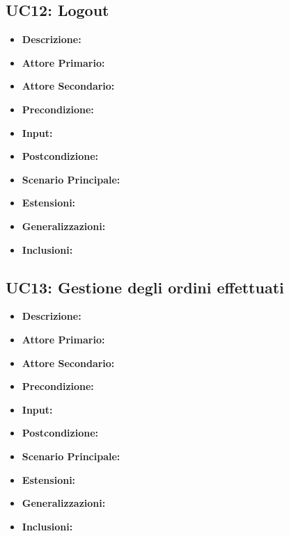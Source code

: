        
        \subsection{UC12: Logout}
        \begin{itemize}
            \item \textbf{Descrizione:}
            \item \textbf{Attore Primario:}
            \item \textbf{Attore Secondario:}
            \item \textbf{Precondizione:}
            \item \textbf{Input:}
            \item \textbf{Postcondizione:}
            \item \textbf{Scenario Principale:}
            \item \textbf{Estensioni:}
            \item \textbf{Generalizzazioni:}
            \item \textbf{Inclusioni:}
        \end{itemize}


        \subsection{UC13: Gestione degli ordini effettuati}
        \begin{itemize}
            \item \textbf{Descrizione:}
            \item \textbf{Attore Primario:}
            \item \textbf{Attore Secondario:}
            \item \textbf{Precondizione:}
            \item \textbf{Input:}
            \item \textbf{Postcondizione:}
            \item \textbf{Scenario Principale:}
            \item \textbf{Estensioni:}
            \item \textbf{Generalizzazioni:}
            \item \textbf{Inclusioni:}
        \end{itemize}


